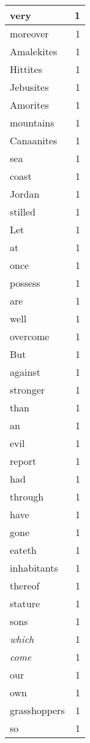 \begin{center}
\begin{longtable}{l|r}
very & 1\\ \hline 
moreover & 1\\ \hline 
Amalekites & 1\\ \hline 
Hittites & 1\\ \hline 
Jebusites & 1\\ \hline 
Amorites & 1\\ \hline 
mountains & 1\\ \hline 
Canaanites & 1\\ \hline 
sea & 1\\ \hline 
coast & 1\\ \hline 
Jordan & 1\\ \hline 
stilled & 1\\ \hline 
Let & 1\\ \hline 
at & 1\\ \hline 
once & 1\\ \hline 
possess & 1\\ \hline 
are & 1\\ \hline 
well & 1\\ \hline 
overcome & 1\\ \hline 
But & 1\\ \hline 
against & 1\\ \hline 
stronger & 1\\ \hline 
than & 1\\ \hline 
an & 1\\ \hline 
evil & 1\\ \hline 
report & 1\\ \hline 
had & 1\\ \hline 
through & 1\\ \hline 
have & 1\\ \hline 
gone & 1\\ \hline 
eateth & 1\\ \hline 
inhabitants & 1\\ \hline 
thereof & 1\\ \hline 
stature & 1\\ \hline 
sons & 1\\ \hline 
\emph{which} & 1\\ \hline 
\emph{come} & 1\\ \hline 
our & 1\\ \hline 
own & 1\\ \hline 
grasshoppers & 1\\ \hline 
so & 1\\ \hline 
\end{longtable}
\end{center}



